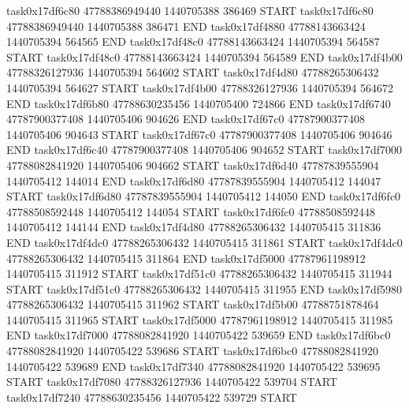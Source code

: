 task0x17df6c80 47788386949440          1440705388               386469  START
task0x17df6c80 47788386949440          1440705388               386471  END
task0x17df4880 47788143663424          1440705394               564565  END
task0x17df48c0 47788143663424          1440705394               564587  START
task0x17df48c0 47788143663424          1440705394               564589  END
task0x17df4b00 47788326127936          1440705394               564602  START
task0x17df4d80 47788265306432          1440705394               564627  START
task0x17df4b00 47788326127936          1440705394               564672  END
task0x17df6b80 47788630235456          1440705400               724866  END
task0x17df6740 47787900377408          1440705406               904626  END
task0x17df67c0 47787900377408          1440705406               904643  START
task0x17df67c0 47787900377408          1440705406               904646  END
task0x17df6c40 47787900377408          1440705406               904652  START
task0x17df7000 47788082841920          1440705406               904662  START
task0x17df6d40 47787839555904          1440705412               144014  END
task0x17df6d80 47787839555904          1440705412               144047  START
task0x17df6d80 47787839555904          1440705412               144050  END
task0x17df6fc0 47788508592448          1440705412               144054  START
task0x17df6fc0 47788508592448          1440705412               144144  END
task0x17df4d80 47788265306432          1440705415               311836  END
task0x17df4dc0 47788265306432          1440705415               311861  START
task0x17df4dc0 47788265306432          1440705415               311864  END
task0x17df5000 47787961198912          1440705415               311912  START
task0x17df51c0 47788265306432          1440705415               311944  START
task0x17df51c0 47788265306432          1440705415               311955  END
task0x17df5980 47788265306432          1440705415               311962  START
task0x17df5b00 47788751878464          1440705415               311965  START
task0x17df5000 47787961198912          1440705415               311985  END
task0x17df7000 47788082841920          1440705422               539659  END
task0x17df6bc0 47788082841920          1440705422               539686  START
task0x17df6bc0 47788082841920          1440705422               539689  END
task0x17df7340 47788082841920          1440705422               539695  START
task0x17df7080 47788326127936          1440705422               539704  START
task0x17df7240 47788630235456          1440705422               539729  START
